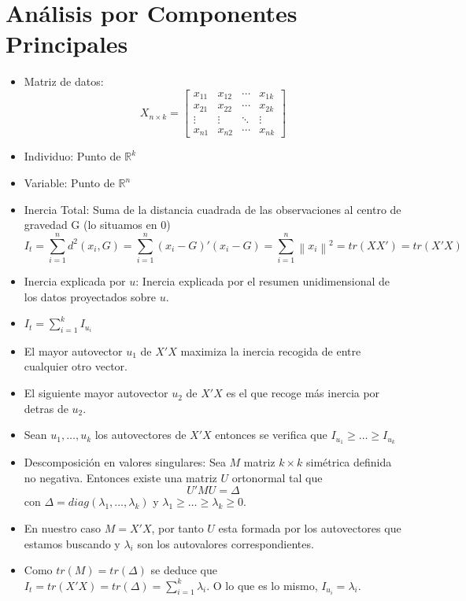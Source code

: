 \section{Análisis por Componentes Principales}

\begin{itemize}
    \item Matriz de datos:
          \[X_{n \times k} = \begin{bmatrix}x_{11} & x_{12} & \cdots & x_{1k} \\ x_{21} & x_{22} & \cdots & x_{2k} \\ \vdots & \vdots & \ddots & \vdots \\ x_{n1} & x_{n2} & \cdots & x_{nk}\end{bmatrix}\]
    \item Individuo: Punto de $\mathbb{R}^k$
    \item Variable: Punto de $\mathbb{R}^n$
    \item Inercia Total: Suma de la distancia cuadrada de las observaciones al centro de gravedad G (lo situamos en 0)
          \[I_t = \sum_{i=1}^{n}d^2(x_i, G) = \sum_{i=1}^{n}(x_i-G)'(x_i-G) = \sum_{i=1}^{n}\left\lVert x_i \right\rVert^2 = tr(XX') = tr(X'X)\]
    \item Inercia explicada por $u$: Inercia explicada por el resumen unidimensional de los datos proyectados sobre $u$.
    \item $I_t = \sum_{i=1}^{k}I_{u_i}$
    \item El mayor autovector $u_1$ de $X'X$ maximiza la inercia recogida de entre cualquier otro vector.
    \item El siguiente mayor autovector $u_2$ de $X'X$ es el que recoge más inercia por detras de $u_2$.
    \item Sean $u_1, \dots, u_k$ los autovectores de $X'X$ entonces se verifica que $I_{u_1} \geq \dots \geq I_{u_k}$
    \item Descomposición en valores singulares: Sea $M$ matriz $k\times k$ simétrica definida no negativa. Entonces existe una matriz $U$ ortonormal tal que
          \[U'MU = \Delta\]
          con $\Delta = diag(\lambda_1, \dots, \lambda_k)$ y $\lambda_1 \geq \dots \geq \lambda_k \geq 0$.
    \item En nuestro caso $M = X'X$, por tanto $U$ esta formada por los autovectores que estamos buscando y $\lambda_i$ son los autovalores correspondientes.
    \item Como $tr(M) = tr(\Delta)$ se deduce que $I_t = tr(X'X) = tr(\Delta) = \sum_{i=1}^{k}\lambda_i$. O lo que es lo mismo, $I_{u_i} = \lambda_i$.

\end{itemize}
